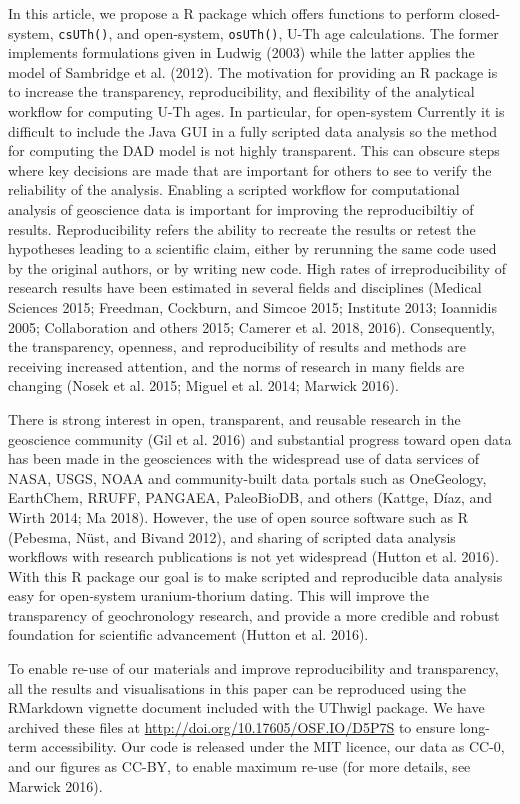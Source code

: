 \documentclass[]{elsarticle} %
\begin{document}
In this article, we propose a R package which offers functions to perform closed-system, \texttt{csUTh()}, and open-system, \texttt{osUTh()}, U-Th age calculations. The former implements formulations given in Ludwig (2003) while the latter applies the model of Sambridge et al. (2012).
The motivation for providing an R package is to increase the transparency, reproducibility, and flexibility of the analytical workflow for computing U-Th ages. In particular, for open-system Currently it is difficult to include the Java GUI in a fully scripted data analysis so the method for computing the DAD model is not highly transparent. This can obscure steps where key decisions are made that are important for others to see to verify the reliability of the analysis. Enabling a scripted workflow for computational analysis of geoscience data is important for improving the reproducibiltiy of results. Reproducibility refers the ability to recreate the results or retest the hypotheses leading to a scientific claim, either by rerunning the same code used by the original authors, or by writing new code. High rates of irreproducibility of research results have been estimated in several fields and disciplines (Medical Sciences 2015; Freedman, Cockburn, and Simcoe 2015; Institute 2013; Ioannidis 2005; Collaboration and others 2015; Camerer et al. 2018, 2016). Consequently, the transparency, openness, and reproducibility of results and methods are receiving increased attention, and the norms of research in many fields are changing (Nosek et al. 2015; Miguel et al. 2014; Marwick 2016).

There is strong interest in open, transparent, and reusable research in the geoscience community (Gil et al. 2016) and substantial progress toward open data has been made in the geosciences with the widespread use of data services of NASA, USGS, NOAA and community-built data portals such as OneGeology, EarthChem, RRUFF, PANGAEA, PaleoBioDB, and others (Kattge, Díaz, and Wirth 2014; Ma 2018). However, the use of open source software such as R (Pebesma, Nüst, and Bivand 2012), and sharing of scripted data analysis workflows with research publications is not yet widespread (Hutton et al. 2016). With this R package our goal is to make scripted and reproducible data analysis easy for open-system uranium-thorium dating. This will improve the transparency of geochronology research, and provide a more credible and robust foundation for scientific advancement (Hutton et al. 2016).

To enable re-use of our materials and improve reproducibility and transparency, all the results and visualisations in this paper can be reproduced using the RMarkdown vignette document included with the UThwigl package. We have archived these files at \url{http://doi.org/10.17605/OSF.IO/D5P7S} to ensure long-term accessibility. Our code is released under the MIT licence, our data as CC-0, and our figures as CC-BY, to enable maximum re-use (for more details, see Marwick 2016).
\end{document}
